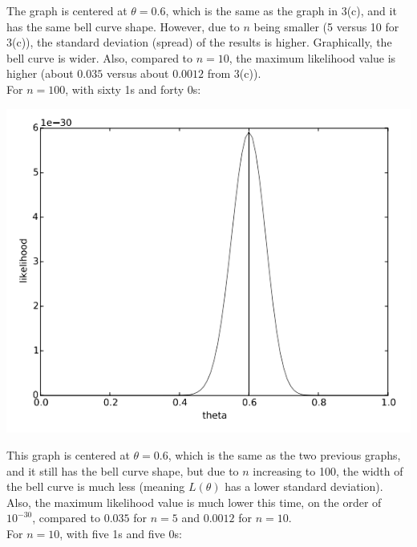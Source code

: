 \documentclass[11pt]{article}
\begin{document}
The graph is centered at $\theta=0.6$, which is the same as the graph in 3(c), and it has the same bell curve shape. However, due to $n$ being smaller (5 versus 10 for 3(c)), the standard deviation (spread) of the results is higher. Graphically, the bell curve is wider. Also, compared to $n=10$, the maximum likelihood value is higher (about $0.035$ versus about $0.0012$ from 3(c)). \\

For $n=100$, with sixty 1s and forty 0s:

\begin{center}
    \includegraphics[scale=0.4]{3d-2.png} \\
\end{center}

This graph is centered at $\theta=0.6$, which is the same as the two previous graphs, and it still has the bell curve shape, but due to $n$ increasing to 100, the width of the bell curve is much less (meaning $L(\theta)$ has a lower standard deviation). Also, the maximum likelihood value is much lower this time, on the order of $10^{-30}$, compared to $0.035$ for $n=5$ and $0.0012$ for $n=10$. \\

For $n=10$, with five 1s and five 0s:
\end{document}
